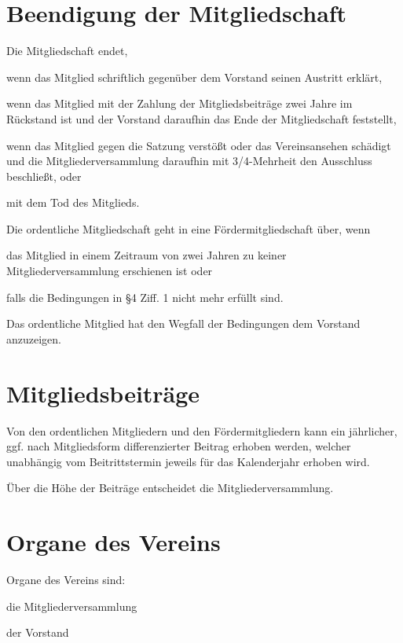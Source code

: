 \section{Beendigung der Mitgliedschaft}
	\begin{myEnum}
		\item Die Mitgliedschaft endet,
			\begin{mySubEnum}
				\item wenn das Mitglied schriftlich gegenüber dem Vorstand seinen Austritt erklärt,
				\item wenn das Mitglied mit der Zahlung der Mitgliedsbeiträge zwei Jahre im Rückstand ist und der Vorstand
				daraufhin das Ende der Mitgliedschaft feststellt,
				\item wenn das Mitglied gegen die Satzung verstößt oder das Vereinsansehen schädigt und die Mitgliederversammlung daraufhin mit 3/4-Mehrheit den Ausschluss beschließt, oder
				\item mit dem Tod des Mitglieds.	
			\end{mySubEnum}
		\item Die ordentliche Mitgliedschaft geht in eine Fördermitgliedschaft über, wenn
			\begin{mySubEnum}
				\item das Mitglied in einem Zeitraum von zwei Jahren zu keiner Mitgliederversammlung erschienen ist oder
				\item falls die Bedingungen in §4 Ziff. 1 nicht mehr erfüllt sind.
			\end{mySubEnum}
		\item Das ordentliche Mitglied hat den Wegfall der Bedingungen dem Vorstand anzuzeigen.
	\end{myEnum}
	
\section{Mitgliedsbeiträge}
	\begin{myEnum}
		\item Von den ordentlichen Mitgliedern und den Fördermitgliedern kann ein jährlicher, ggf. nach Mitgliedsform differenzierter Beitrag erhoben werden, welcher unabhängig vom Beitrittstermin jeweils für das Kalenderjahr erhoben wird.
		\item Über die Höhe der Beiträge entscheidet die Mitgliederversammlung.
	\end{myEnum}

\section{Organe des Vereins}
	\begin{myEnum}
		\item Organe des Vereins sind:
			\begin{mySubEnum}
				\item die Mitgliederversammlung
				\item der Vorstand
			\end{mySubEnum}
	\end{myEnum}